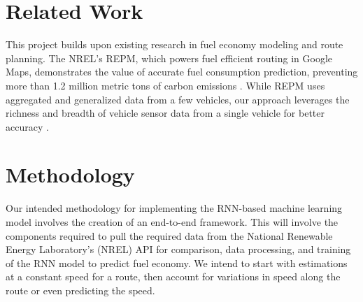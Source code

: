\documentclass[letterpaper]{article}
\begin{document}
\section{Related Work}

This project builds upon existing research in fuel economy modeling and route planning. 
The NREL's REPM, which powers fuel efficient routing in Google Maps, 
demonstrates the value of accurate fuel consumption prediction, 
preventing more than 1.2 million metric tons of carbon emissions \cite{google_2023_environmental_report}.
While REPM uses aggregated and generalized data from a few vehicles, 
our approach leverages the richness and breadth of vehicle sensor data from a single vehicle for better accuracy \cite{nrel_routee}.

\section{Methodology} %
Our intended methodology for implementing the RNN-based machine learning model involves the creation of an end-to-end
framework. This will involve the components required to pull the required data from the National Renewable
Energy Laboratory's (NREL) API for comparison, data processing, and training of the RNN model to predict fuel economy.
We intend to start with estimations at a constant speed for a route, 
then account for variations in speed along the route or even predicting the speed.



 
\end{document}
